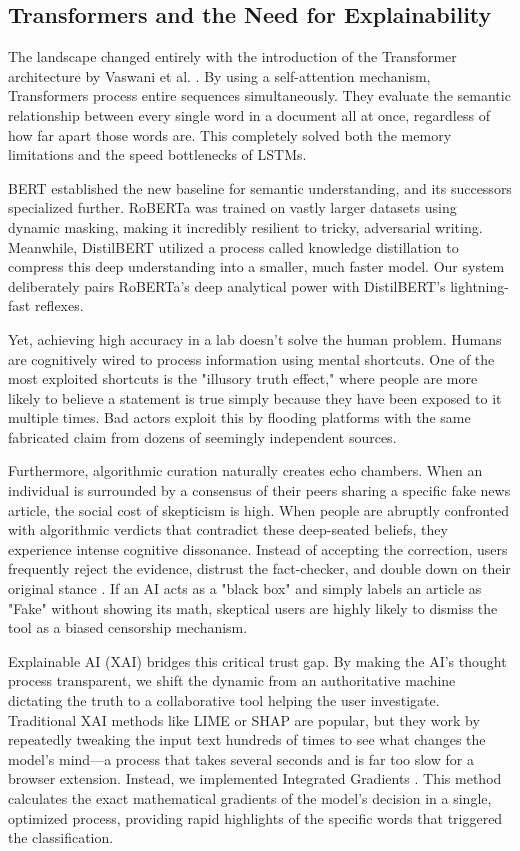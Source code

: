 \documentclass[conference]{IEEEtran}
\begin{document}
\subsection{Transformers and the Need for Explainability}
The landscape changed entirely with the introduction of the Transformer architecture by Vaswani et al. \cite{b1}. By using a self-attention mechanism, Transformers process entire sequences simultaneously. They evaluate the semantic relationship between every single word in a document all at once, regardless of how far apart those words are. This completely solved both the memory limitations and the speed bottlenecks of LSTMs.

BERT \cite{b2} established the new baseline for semantic understanding, and its successors specialized further. RoBERTa \cite{b3} was trained on vastly larger datasets using dynamic masking, making it incredibly resilient to tricky, adversarial writing. Meanwhile, DistilBERT \cite{b6} utilized a process called knowledge distillation to compress this deep understanding into a smaller, much faster model. Our system deliberately pairs RoBERTa's deep analytical power with DistilBERT's lightning-fast reflexes.

Yet, achieving high accuracy in a lab doesn't solve the human problem. Humans are cognitively wired to process information using mental shortcuts. One of the most exploited shortcuts is the "illusory truth effect," where people are more likely to believe a statement is true simply because they have been exposed to it multiple times. Bad actors exploit this by flooding platforms with the same fabricated claim from dozens of seemingly independent sources.

Furthermore, algorithmic curation naturally creates echo chambers. When an individual is surrounded by a consensus of their peers sharing a specific fake news article, the social cost of skepticism is high. When people are abruptly confronted with algorithmic verdicts that contradict these deep-seated beliefs, they experience intense cognitive dissonance. Instead of accepting the correction, users frequently reject the evidence, distrust the fact-checker, and double down on their original stance \cite{b14}. If an AI acts as a "black box" and simply labels an article as "Fake" without showing its math, skeptical users are highly likely to dismiss the tool as a biased censorship mechanism. 

Explainable AI (XAI) bridges this critical trust gap. By making the AI's thought process transparent, we shift the dynamic from an authoritative machine dictating the truth to a collaborative tool helping the user investigate. Traditional XAI methods like LIME or SHAP are popular, but they work by repeatedly tweaking the input text hundreds of times to see what changes the model's mind—a process that takes several seconds and is far too slow for a browser extension. Instead, we implemented Integrated Gradients \cite{b7}. This method calculates the exact mathematical gradients of the model's decision in a single, optimized process, providing rapid highlights of the specific words that triggered the classification.
\end{document}
